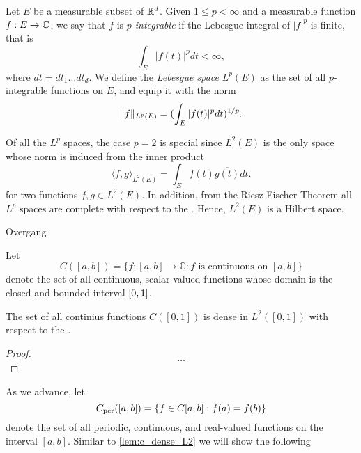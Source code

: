 \documentclass[../thesis.tex]{subfiles}
\begin{document}
\begin{definition}
    Let $E$ be a measurable subset of $\mathbb{R}^d$. Given $1 \leq p < \infty$ and a measurable function $f:E\rightarrow \mathbb{C}$, we say that $f$ is \emph{$p$-integrable} if the Lebesgue integral of $|f|^p$ is finite, that is
    \begin{equation*}
        \int_{E} |f(t)|^p dt < \infty,
    \end{equation*}
    where $dt= dt_1 \dots dt_d$. We define the \emph{Lebesgue space} $L^p(E)$ as the set of all $p$-integrable functions on $E$, and equip it with the norm
    \begin{equation*}
        \|f\|_{L^p(E)} = (\int_{E} |f(t)|^p dt)^{1/p}.
    \end{equation*}
\end{definition}

Of all the $L^p$ spaces, the case $p=2$ is special since $L^2(E)$ is the only space whose norm is induced from the inner product
\begin{equation}
    \langle f, g\rangle_{L^2(E)} = \int_{E} f(t)\overline{g(t)} dt.
\end{equation}
for two functions $f,g\in L^2(E)$. In addition, from the Riesz-Fischer Theorem \cite[p.~279]{heilIntroductionRealAnalysis2019} all $L^p$ spaces are complete with respect to the \LPnorm. Hence, $L^2(E)$ is a Hilbert space. 


\colorbox{BurntOrange}{Overgang}


Let
\begin{equation}
    C([a,b]) = \{f:[a,b] \rightarrow \mathbb{C}: f \text{ is continuous on } [a,b]\}
\end{equation}
denote the set of all continuous, scalar-valued functions whose domain is the closed and bounded interval $[0,1]$.

\begin{lemma}\label{lem:c_dense_L2}
    The set of all continius functions $C([0,1])$ is dense in $L^2([0,1])$ with respect to the \Ltwonorm \cite[p.~326]{rudinPrinciplesMathematicalAnalysis20}.
\end{lemma}

\begin{proof}
    $$\dots$$
\end{proof}

As we advance, let
\begin{equation*}
    C_{\text{per}}([a,b])=\{f \in C[a,b]: f(a)=f(b)\}
\end{equation*}
denote the set of all periodic, continuous, and real-valued functions on the interval $[a,b]$. Similar to \cref{lem:c_dense_L2} we will show the following
\end{document}
